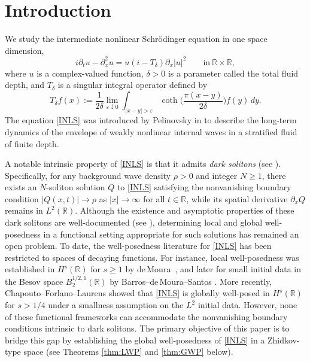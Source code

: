 \documentclass{amsart}
\numberwithin{equation}{section}
\newcommand{\R}{\mathbb{R}}
\newcommand{\Td}{T_{\delta}}
\begin{document}

\section{Introduction}
\label{sec:intro}

We study the intermediate nonlinear Schr\"odinger equation in one space dimension, 
\begin{equation*}\tag{INLS}\label{INLS}
i\partial_tu - \partial_x^2 u = u (i - \Td)\partial_x |u|^2 
\qquad 
\mbox{in}~\mathbb{R}\times \mathbb{R}, 
\end{equation*}
where $u$ is a complex-valued function, $\delta>0$ is a parameter called the total fluid depth, and $\Td$ is a singular integral operator defined by
\[ \Td f (x) := \frac{1}{2\delta}\lim_{\varepsilon \downarrow 0} \int_{|x-y|>\varepsilon} \coth{\Big( \frac{\pi (x-y)}{2\delta}\Big)}f(y)\,dy . \]
The equation \eqref{INLS} was introduced by Pelinovsky in \cite{P} to describe the long-term dynamics of the envelope of weakly nonlinear internal waves in a stratified fluid of finite depth.

A notable intrinsic property of \eqref{INLS} is that it admits \emph{dark solitons} (see \cite{P,PG,Matsuno1}). 
Specifically, for any background wave density $\rho>0$ and integer $N\geq 1$, there exists an $N$-soliton solution $Q$ to \eqref{INLS} satisfying the nonvanishing boundary condition $|Q(x,t)|\to \rho$ as $|x|\to \infty$ for all $t\in\R$, while its spatial derivative $\partial_x Q$ remains in $L^2(\mathbb{R})$. 
Although the existence and asymptotic properties of these dark solitons are well-documented (see \cite{Akahori}), determining local and global well-posedness in a functional setting appropriate for such solutions has remained an open problem. 
To date, the well-posedness literature for \eqref{INLS} has been restricted to spaces of decaying functions. 
For instance, local well-posedness was established in $H^s(\R)$ for $s\geq1$ by de\,Moura~\cite{DeMoura}, and later for small initial data in the Besov space $B_2^{1/2,1}(\R)$ by Barros--de\,Moura--Santos \cite{B-deM-S}. 
More recently, Chapouto--Forlano--Laurens \cite{CFL} showed that \eqref{INLS} is globally well-posed in $H^s(\R)$ for $s>1/4$ under a smallness assumption on the $L^2$ initial data. 
However, none of these functional frameworks can accommodate the nonvanishing boundary conditions intrinsic to dark solitons. 
The primary objective of this paper is to bridge this gap by establishing the global well-posedness of \eqref{INLS} in a Zhidkov-type space (see Theorems \ref{thm:LWP} and \ref{thm:GWP} below).
\end{document}
